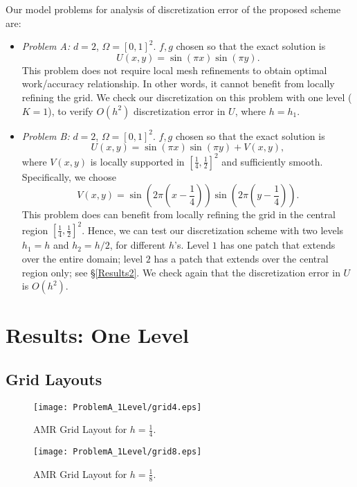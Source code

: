 \documentclass[12pt]{article}
\def \be {\begin{equation}}
\def \ee {\end{equation}}
\def \bi {\begin{itemize}}
\def \ei {\end{itemize}}
\begin{document}
Our model problems for analysis of discretization error of the proposed scheme
are:
\bi
\item \emph{Problem A:} $d = 2$, $\Omega = [0,1]^2$.
$f,g$ chosen so that the exact solution is
\be
U(x,y) = \sin\left(\pi x\right) \sin\left(\pi y\right).
\ee
This problem does not require local mesh refinements to obtain optimal
work/accuracy relationship. In other words, it cannot benefit from locally
refining the grid. We check our discretization on this problem with one level
($K=1$), to verify $O(h^2)$ discretization error in $U$, where $h=h_1$.

\item \emph{Problem B:} $d = 2$, $\Omega = [0,1]^2$.
$f,g$ chosen so that the exact solution is
\be
U(x,y) = \sin(\pi x) \sin(\pi y) + V(x,y),
\ee
where $V(x,y)$ is locally supported in $[\frac14,\frac12]^2$ and sufficiently
smooth. Specifically, we choose
\be
V(x,y) = \sin\left(2 \pi (x-\frac14)\right)
\sin\left(2 \pi (y - \frac14)\right).
\ee
This problem does can benefit from locally refining the grid in the central
region $[\frac14,\frac12]^2$. Hence, we can test our discretization scheme
with two levels $h_1=h$ and $h_2=h/2$, for different $h$'s. Level $1$ has
one patch that extends over the entire domain; level $2$ has a patch that
extends over the central region only; see \S \ref{Results2}. We check again
that the discretization error in $U$ is $O(h^2)$.
\ei

\newpage
\section{Results: One Level}
\label{Results1}

\subsection{Grid Layouts}

\begin{figure}[htbp]
\begin{center}
\texttt{[image: ProblemA\_1Level/grid4.eps]}
\end{center}
\caption{AMR Grid Layout for $h = \frac14$.}
\label{grid4}
\end{figure}  

\begin{figure}[htbp]
\begin{center}
\texttt{[image: ProblemA\_1Level/grid8.eps]}
\end{center}
\caption{AMR Grid Layout for $h = \frac18$.}
\label{grid8}
\end{figure}  
\end{document}
